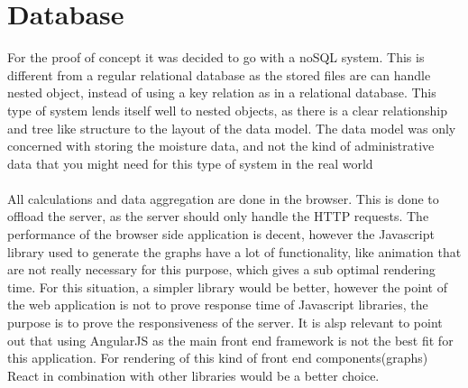 \documentclass[]{uiophd}
\begin{document}
\section{Database}
For the proof of concept it was decided to go with a noSQL system. This is different from a regular relational database as the stored files are can handle nested object, instead of using a key relation as in a relational database. This type of system lends itself well to nested objects, as there is a clear relationship and tree like structure to the layout of the data model. The data model was only concerned with storing the moisture data, and not the kind of administrative data that you might need for this type of system in the real world
\\\\
All calculations and data aggregation are done in the browser. This is done to offload the server, as the server should only handle the HTTP requests. The performance of the browser side application is decent, however the Javascript library used to generate the graphs have a lot of functionality, like animation that are not really necessary for this purpose, which gives a sub optimal rendering time. For this situation, a simpler library would be better, however the point of the web application is not to prove response time of Javascript libraries, the purpose is to prove the responsiveness of the server. It is alsp relevant to point out that using AngularJS as the main front end framework is not the best fit for this application. For rendering of this kind of front end components(graphs) React in combination with other libraries would be a better choice. 
\end{document}
